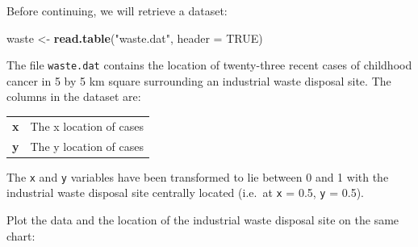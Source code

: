 \documentclass[12pt,a4paper]{book}
\newenvironment{Shaded}{\begin{snugshade}}{\end{snugshade}}
\newcommand{\KeywordTok}[1]{\textcolor[rgb]{0.13,0.29,0.53}{\textbf{#1}}}
\newcommand{\DataTypeTok}[1]{\textcolor[rgb]{0.13,0.29,0.53}{#1}}
\newcommand{\DecValTok}[1]{\textcolor[rgb]{0.00,0.00,0.81}{#1}}
\newcommand{\FloatTok}[1]{\textcolor[rgb]{0.00,0.00,0.81}{#1}}
\newcommand{\StringTok}[1]{\textcolor[rgb]{0.31,0.60,0.02}{#1}}
\newcommand{\OtherTok}[1]{\textcolor[rgb]{0.56,0.35,0.01}{#1}}
\newcommand{\OperatorTok}[1]{\textcolor[rgb]{0.81,0.36,0.00}{\textbf{#1}}}
\newcommand{\NormalTok}[1]{#1}
\theoremstyle{definition}
\theoremstyle{definition}
\theoremstyle{definition}
\theoremstyle{remark}
\begin{document}
Before continuing, we will retrieve a dataset:

\begin{Shaded}
\begin{Highlighting}[]
\NormalTok{waste <-}\StringTok{ }\KeywordTok{read.table}\NormalTok{(}\StringTok{"waste.dat"}\NormalTok{, }\DataTypeTok{header =} \OtherTok{TRUE}\NormalTok{)}
\end{Highlighting}
\end{Shaded}

The file \texttt{waste.dat} contains the location of twenty-three recent
cases of childhood cancer in 5 by 5 km square surrounding an industrial
waste disposal site. The columns in the dataset are:

\begin{longtable}[]{@{}ll@{}}
\toprule
\begin{minipage}[t]{0.14\columnwidth}\raggedright
\textbf{x}\strut
\end{minipage} & \begin{minipage}[t]{0.41\columnwidth}\raggedright
The x location of cases\strut
\end{minipage}\tabularnewline
\begin{minipage}[t]{0.14\columnwidth}\raggedright
\textbf{y}\strut
\end{minipage} & \begin{minipage}[t]{0.41\columnwidth}\raggedright
The y location of cases\strut
\end{minipage}\tabularnewline
\bottomrule
\end{longtable}

The \texttt{x} and \texttt{y} variables have been transformed to lie
between 0 and 1 with the industrial waste disposal site centrally
located (i.e.~at \texttt{x} = 0.5, \texttt{y} = 0.5).

Plot the data and the location of the industrial waste disposal site on
the same chart:

\begin{Shaded}
\end{Shaded}
\end{document}

